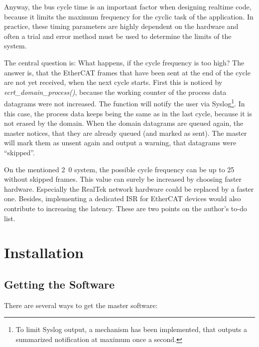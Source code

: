 \documentclass[a4paper,12pt,BCOR=6mm,bibtotoc,idxtotoc]{scrbook}
\begin{document}
Anyway, the bus cycle time is an important factor when designing realtime
code, because it limits the maximum frequency for the cyclic task of the
application.  In practice, these timing parameters are highly dependent on the
hardware and often a trial and error method must be used to determine the
limits of the system.

The central question is: What happens, if the cycle frequency is too high? The
answer is, that the EtherCAT frames that have been sent at the end of the
cycle are not yet received, when the next cycle starts.  First this is noticed
by \textit{ecrt\_domain\_process()}, because the working counter of the
process data datagrams were not increased. The function will notify the user
via Syslog\footnote{To limit Syslog output, a mechanism has been implemented,
that outputs a summarized notification at maximum once a second.}. In this
case, the process data keeps being the same as in the last cycle, because it
is not erased by the domain. When the domain datagrams are queued again, the
master notices, that they are already queued (and marked as sent). The master
will mark them as unsent again and output a warning, that datagrams were
``skipped''.

On the mentioned \unit{2.0}{\giga\hertz} system, the possible cycle frequency
can be up to \unit{25}{\kilo\hertz} without skipped frames. This value can
surely be increased by choosing faster hardware. Especially the RealTek
network hardware could be replaced by a faster one. Besides, implementing a
dedicated ISR for EtherCAT devices would also contribute to increasing the
latency. These are two points on the author's to-do list.


\chapter{Installation}
\label{sec:installation}

\section{Getting the Software}
\label{sec:getting}

There are several ways to get the master software:
\end{document}
